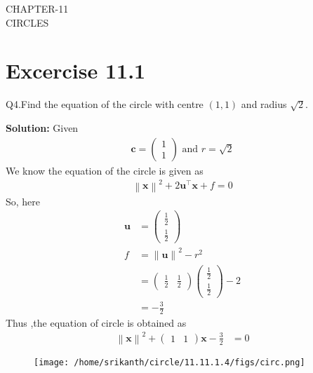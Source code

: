 \documentclass[12pt]{article}
\providecommand{\norm}[1]{\left\lVert#1\right\rVert}
\newcommand{\solution}{\noindent \textbf{Solution: }}
\newcommand{\myvec}[1]{\ensuremath{\begin{pmatrix}#1\end{pmatrix}}}
\let\vec\mathbf
\begin{document}
\begin{center}
\textbf\large{CHAPTER-11 \\ CIRCLES}

\end{center}
\section*{Excercise 11.1}

Q4.Find the equation of the circle with centre $(1,1)$ and radius $\sqrt{2}$.

\solution
Given
\begin{align}
	\vec{c} = \myvec{1\\1} \text{ and } r = \sqrt{2}
\end{align}
We know the equation of the circle is given as
\begin{align}
	\norm{\vec{x}}^{2} + 2\vec{u}^{\top}\vec{x} + f = 0
\end{align}
So, here
\begin{align}
	\vec{u} &= \myvec{\frac{1}{2}\\[2pt]\frac{1}{2}}\\
	f &= \norm{\vec{u}}^2 - r^2\\
	  &= \myvec{\frac{1}{2}&\frac{1}{2}}\myvec{\frac{1}{2}\\[2pt]\frac{1}{2}}-2\\
	  &=-\frac{3}{2}	  
\end{align}
Thus ,the equation of circle is obtained as
\begin{align}
	\norm{\vec{x}}^2 + \myvec{1&1}\vec{x}-\frac{3}{2} &= 0       		       
\end{align}	
\begin{figure}[!h]
	\begin{center} 
	  \texttt{[image: /home/srikanth/circle/11.11.1.4/figs/circ.png]}
	\end{center}
\caption{}
\label{fig:Fig1}
\end{figure}
\end{document}
